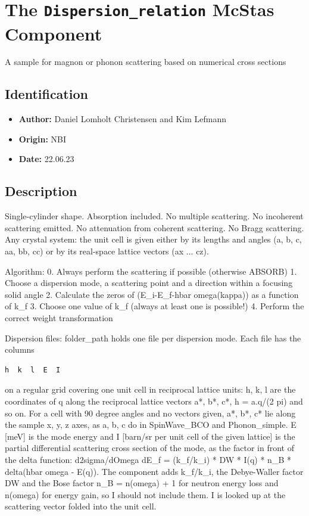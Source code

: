 \section{The \texttt{Dispersion\_relation} McStas Component}
A sample for magnon or phonon scattering based on numerical cross sections

\subsection*{Identification}
\begin{itemize}
  \item \textbf{Author:} Daniel Lomholt Christensen and Kim Lefmann
  \item \textbf{Origin:} NBI
  \item \textbf{Date:} 22.06.23
\end{itemize}

\subsection*{Description}
Single-cylinder shape. Absorption included. No multiple scattering. No incoherent scattering emitted. No attenuation from coherent scattering. No Bragg scattering. Any crystal system: the unit cell is given either by its lengths and angles (a, b, c, aa, bb, cc) or by its real-space lattice vectors (ax ... cz).

Algorithm: 0. Always perform the scattering if possible (otherwise ABSORB) 1. Choose a dispersion mode, a scattering point and a direction within a focusing solid angle 2. Calculate the zeros of (E\_i-E\_f-hbar omega(kappa)) as a function of k\_f 3. Choose one value of k\_f (always at least one is possible!) 4. Perform the correct weight transformation

Dispersion files: folder\_path holds one file per dispersion mode. Each file has the columns

\begin{verbatim}
h  k  l  E  I
\end{verbatim}

on a regular grid covering one unit cell in reciprocal lattice units: h, k, l are the coordinates of q along the reciprocal lattice vectors a*, b*, c*, h = a.q/(2 pi) and so on. For a cell with 90 degree angles and no vectors given, a*, b*, c* lie along the sample x, y, z axes, as a, b, c do in SpinWave\_BCO and Phonon\_simple. E [meV] is the mode energy and I [barn/sr per unit cell of the given lattice] is the partial differential scattering cross section of the mode, as the factor in front of the delta function: d2sigma/dOmega dE\_f = (k\_f/k\_i) * DW * I(q) * n\_B * delta(hbar omega - E(q)). The component adds k\_f/k\_i, the Debye-Waller factor DW and the Bose factor n\_B = n(omega) + 1 for neutron energy loss and n(omega) for energy gain, so I should not include them. I is looked up at the scattering vector folded into the unit cell.

